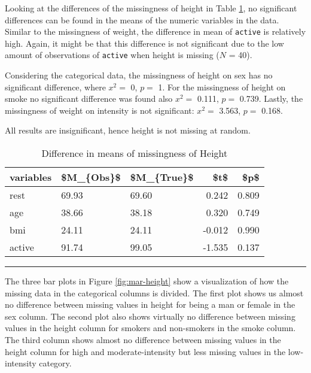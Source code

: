 \documentclass[
]{article}
\begin{document}
Looking at the differences of the missingness of height in Table \ref{tab:missH}, no significant differences can be found in the means of the numeric variables in the data. Similar to the missingness of weight, the difference in mean of \texttt{active} is relatively high. Again, it might be that this difference is not significant due to the low amount of observations of \texttt{active} when height is missing (\(N\) = 40).

Considering the categorical data, the missingness of height on sex has no significant difference, where \(x^2 =\) 0, \(p =\) 1. For the missingness of height on smoke no significant difference was found also \(x^2 =\) 0.111, \(p =\) 0.739. Lastly, the missingness of weight on intensity is not significant: \(x^2 =\) 3.563, \(p =\) 0.168.

All results are insignificant, hence height is not missing at random.

\begin{table}

\caption{\label{tab:missH}Difference in means of missingness of Height}
\centering
\begin{tabular}[t]{l|l|l|r|r}
\hline
variables & \$M\_\{Obs\}\$ & \$M\_\{True\}\$ & \$t\$ & \$p\$\\
\hline
rest & 69.93 & 69.60 & 0.242 & 0.809\\
\hline
age & 38.66 & 38.18 & 0.320 & 0.749\\
\hline
bmi & 24.11 & 24.11 & -0.012 & 0.990\\
\hline
active & 91.74 & 99.05 & -1.535 & 0.137\\
\hline
\end{tabular}
\end{table}

\begin{center}\rule{0.5\linewidth}{0.5pt}\end{center}

The three bar plots in Figure \ref{fig:mar-height} show a visualization of how the missing data in the categorical columns is divided. The first plot shows us almost no difference between missing values in height for being a man or female in the sex column. The second plot also shows virtually no difference between missing values in the height column for smokers and non-smokers in the smoke column. The third column shows almost no difference between missing values in the height column for high and moderate-intensity but less missing values in the low-intensity category.
\end{document}
